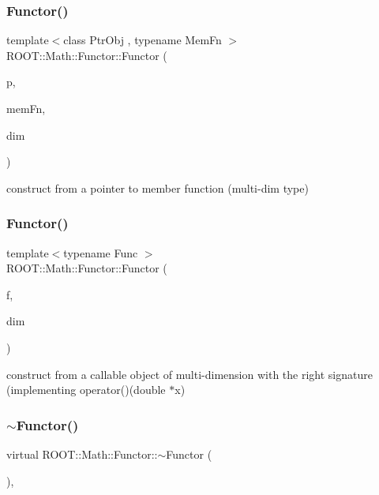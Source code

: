 \subsubsection{\texorpdfstring{Functor()}{Functor()}\hspace{0.1cm}{\footnotesize\ttfamily [2/8]}}
{\footnotesize\ttfamily template$<$class Ptr\+Obj , typename Mem\+Fn $>$ \\
R\+O\+O\+T\+::\+Math\+::\+Functor\+::\+Functor (\begin{DoxyParamCaption}\item[{const Ptr\+Obj \&}]{p,  }\item[{Mem\+Fn}]{mem\+Fn,  }\item[{unsigned int}]{dim }\end{DoxyParamCaption})\hspace{0.3cm}{\ttfamily [inline]}}

construct from a pointer to member function (multi-\/dim type) \mbox{\label{classROOT_1_1Math_1_1Functor_a82af0df828055f18310af5d49dcc3aa2}} 
\subsubsection{\texorpdfstring{Functor()}{Functor()}\hspace{0.1cm}{\footnotesize\ttfamily [3/8]}}
{\footnotesize\ttfamily template$<$typename Func $>$ \\
R\+O\+O\+T\+::\+Math\+::\+Functor\+::\+Functor (\begin{DoxyParamCaption}\item[{const Func \&}]{f,  }\item[{unsigned int}]{dim }\end{DoxyParamCaption})\hspace{0.3cm}{\ttfamily [inline]}}

construct from a callable object of multi-\/dimension with the right signature (implementing operator()(double $\ast$x) \mbox{\label{classROOT_1_1Math_1_1Functor_a349935f827a453deb17fdad728849028}} 
\subsubsection{\texorpdfstring{$\sim$Functor()}{~Functor()}\hspace{0.1cm}{\footnotesize\ttfamily [1/2]}}
{\footnotesize\ttfamily virtual R\+O\+O\+T\+::\+Math\+::\+Functor\+::$\sim$\+Functor (\begin{DoxyParamCaption}{ }\end{DoxyParamCaption})\hspace{0.3cm}{\ttfamily [inline]}, {\ttfamily [virtual]}}

